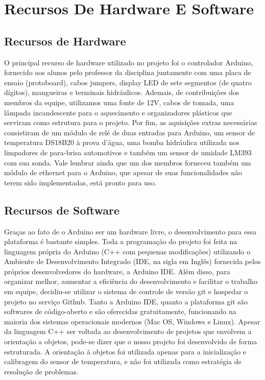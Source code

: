 \documentclass[a4paper,12pt]{article}
\begin{document}
\section{Recursos De Hardware E Software}
\subsection{Recursos de Hardware}
O principal recurso de hardware utilizado no projeto foi o controlador Arduino, fornecido aos alunos pelo professor da disciplina juntamente com uma placa de ensaio (protoboard), cabos jumpers, display LED de sete segmentos (de quatro dígitos), mangueiras e terminais hidráulicos. Ademais, de contribuições dos membros da equipe, utilizamos uma fonte de 12V, cabos de tomada, uma lâmpada incandescente para o aquecimento  e organizadores plásticos que serviram como estrutura para o projeto. Por fim, as aquisições extras necessárias consistiram de um módulo de relé de duas entradas para Arduino, um sensor de temperatura DS18B20 à prova d’água, uma bomba hidráulica utilizada nos limpadores de para-brisa automotivos e também um sensor de umidade LM393 com sua sonda. Vale lembrar ainda que um dos membros forneceu também um módulo de ethernet para o Arduino, que apesar de suas funcionalidades não terem sido implementadas, está pronto para uso.

\subsection{Recursos de Software}
Graças ao fato de o Arduino ser um hardware livre, o desenvolvimento para essa plataforma é bastante simples. Toda a programação do projeto foi feita na linguagem própria do Arduino (C++ com pequenas modificações) utilizando o Ambiente de Desenvolvimento Integrado (IDE, na sigla em Inglês) fornecida pelos próprios desenvolvedores do hardware, a Arduino IDE. Além disso, para organizar melhor, aumentar a eficiência do desenvolvimento e facilitar o trabalho em equipe, decidiu-se utilizar o sistema de controle de versão git e hospedar o projeto no serviço Github. Tanto a Arduino IDE, quanto a plataforma git são softwares de código-aberto e são oferecidas gratuitamente, funcionando na maioria dos sistemas operacionais modernos (Mac OS, Windows e Linux).
    Apesar da linguagem C++ ser voltada ao desenvolvimento de projetos que envolvem a orientação a objetos, pode-se dizer que o nosso projeto foi desenvolvido de forma estruturada. A orientação à objetos foi utilizada apenas para a inicialização e calibragem do sensor de temperatura, e não foi utilizada como estratégia de resolução de problemas.
\end{document}

